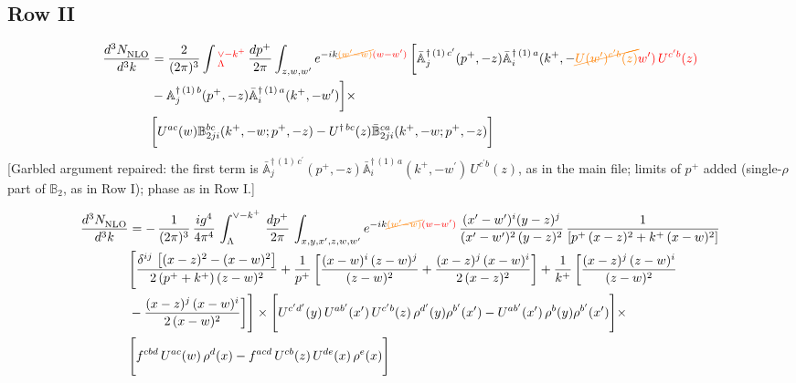 \documentclass[9pt]{article}
\def\mf#1{\mathbb{#1}}
\numberwithin{equation}{section}
\begin{document}
\subsection{Row II\,}
\begin{align}
    \frac{d^{3}N_{\rm NLO}^{\rm}}{d^{3}k}  & =    \frac{2}{(2\pi)^{3}} \int{\color{red}_{\Lambda}^{\vee-k^{+}}}\, \frac{dp^{+}}{2\pi}\int_{z,w,w^{\prime}} e^{-ik{\color{orange}\cancel{(w^{\prime}-w)}}{\color{red}(w-w^{\prime})}}\,\bigg[\Bar{\mf{A}}^{\dagger\,(1)\, c^{\prime}}_{j}(p^{+},-z)\Bar{\mf{A}}^{\dagger\, (1)\, a}_{i}(k^{+},-{\color{orange}\cancel{U(w^{\prime})^{c^{\prime}b}(z)}}{\color{red}w^{\prime})\,U^{c^{\prime}b}(z)}\notag \\ & - \mf{A}^{\dagger\, (1)\, b}_{j}(p^{+},- z)\Bar{\mf{A}}^{\dagger\, (1)\, a}_{i}(k^{+},- w^{\prime})\bigg] \times \notag \\ & \bigg[U^{ac}(w) \mf{B}^{bc}_{2ji}(k^{+},-w;p^{+},-z) -U^{\dagger\, bc}(z)\Bar{\mf{B}}^{ca}_{2ji}(k^{+},-w; p^{+},-z)\bigg] \nonumber
\end{align} {\color{red}[Garbled argument repaired: the first term is $\bar{\mf{A}}^{\dagger\,(1)\,c^{\prime}}_{j}(p^{+},-z)\bar{\mf{A}}^{\dagger\,(1)\,a}_{i}(k^{+},-w^{\prime})\,U^{c^{\prime}b}(z)$, as in the main file; limits of $p^{+}$ added (single-$\rho$ part of $\mf{B}_{2}$, as in Row I); phase as in Row I.]}\par\noindent 
\begin{align}
    \frac{d^{3}N_{\rm NLO}^{\rm}}{d^{3}k}  & =  -\,\frac{1}{(2\pi)^{3}}\,\frac{ig^{4}}{4\pi^{4}}\,\int_{\Lambda}^{\vee-k^{+}}\,\frac{dp^{+}}{2\pi}\, \int_{x,y,x',z,w,w^{\prime}} e^{-ik{\color{orange}\cancel{(w^{\prime}-w)}}{\color{red}(w-w^{\prime})}}\, \frac{(x'-w')^{i}(y-z)^{j}}{(x'-w')^{2}\,(y-z)^{2}}\, \frac{1}{\left[p^{+}\,(x-z)^{2}+k^{+}\,(x-w)^{2}\right]}\notag \\ & \Bigg[\frac{\delta^{ij}\, \left[(x-z)^{2}-(x-w)^{2}\right]}{2\, (p^{+}+k^{+})\,(z-w)^{2}}+\frac{1}{p^{+}}\, \bigg[\frac{(x-w)^{i}\,(z-w)^{j}}{(z-w)^{2}}+\frac{(x-z)^{j}\,(x-w)^{i}}{2\,(x-z)^{2}}\bigg]+\frac{1}{k^{+}}\,\bigg[\frac{(x-z)^{j}\,(z-w)^{i}}{(z-w)^{2}}\notag \\ & -\frac{(x-z)^{j}\,(x-w)^{i}}{2\,(x-w)^{2}}\bigg]\Bigg]\times \Bigg[U^{c'd'}(y)\,U^{ab'}(x')\,U^{c'b}(z)\,\rho^{d'}(y)\rho^{b'}(x')-U^{ab'}(x')\,\rho^{b}(y)\rho^{b'}(x')\Bigg]\times \notag \\ & \Bigg[f^{cbd}\,U^{ac}(w)\,\rho^{d}(x)-f^{acd}\, U^{cb}(z)\,U^{de}(x)\,\rho^{e}(x)\Bigg]
\end{align}
\end{document}
